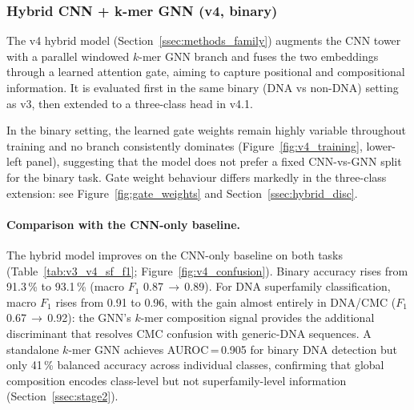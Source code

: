 \documentclass[12pt]{article}
\begin{document}
\subsubsection{Hybrid CNN + k-mer GNN (v4, binary)}\label{ssec:hybrid}

The v4 hybrid model (Section~\ref{ssec:methods_family}) augments the CNN tower with a parallel windowed $k$-mer GNN branch and fuses the two embeddings through a learned attention gate, aiming to capture positional and compositional information. It is evaluated first in the same binary (DNA vs non-DNA) setting as v3, then extended to a three-class head in v4.1. 

In the binary setting, the learned gate weights remain highly variable throughout training and no branch consistently dominates (Figure~\ref{fig:v4_training}, lower-left panel), suggesting that the model does not prefer a fixed CNN-vs-GNN split for the binary task. Gate weight behaviour differs markedly in the three-class extension: see Figure~\ref{fig:gate_weights} and Section~\ref{ssec:hybrid_disc}. 

\paragraph{Comparison with the CNN-only baseline.}

The hybrid model improves on the CNN-only baseline on both tasks (Table~\ref{tab:v3_v4_sf_f1}; Figure~\ref{fig:v4_confusion}). Binary accuracy rises from 91.3\,\% to 93.1\,\% (macro $F_1$ 0.87\,$\to$\,0.89). For DNA superfamily classification, macro $F_1$ rises from 0.91 to 0.96, with the gain almost entirely in DNA/CMC ($F_1$ 0.67\,$\to$\,0.92): the GNN's $k$-mer composition signal provides the additional discriminant that resolves CMC confusion with generic-DNA sequences. A standalone $k$-mer GNN achieves AUROC\,=\,0.905 for binary DNA detection but only 41\,\% balanced accuracy across individual classes, confirming that global composition encodes class-level but not superfamily-level information (Section~\ref{ssec:stage2}). 
\end{document}
